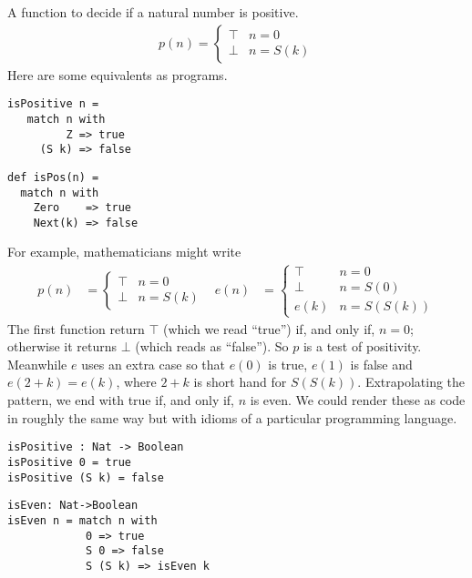 \begin{example}
A function to decide if a natural number is positive.
    \begin{gather*}
        p(n) = \begin{cases}
            \top & n=0\\
            \bot & n=S(k)
        \end{cases}
    \end{gather*}
Here are some equivalents as programs.
\begin{center}
\begin{minipage}{2.5in}
\begin{lstlisting}[language=Hidris]
isPositive n = 
   match n with
         Z => true
     (S k) => false            
\end{lstlisting}
\end{minipage}
\hfill
\begin{minipage}{2in}
\begin{lstlisting}[language=Sava]
def isPos(n) = 
  match n with
    Zero    => true
    Next(k) => false            
\end{lstlisting}
\end{minipage}
\end{center}

                
\end{example}
For example, mathematicians might write
\begin{align*}
    p(n) & = \begin{cases}
        \top & n=0\\
        \bot & n=S(k)
    \end{cases}
    &
    e(n) & = \begin{cases}
        \top & n=0\\
        \bot & n=S(0)\\
        e(k) & n=S(S(k))
    \end{cases}
\end{align*}
The first function return $\top$ (which we read ``true'') if, and only if,
$n=0$; otherwise it returns $\bot$ (which reads as ``false'').  So $p$ is a test
of positivity.  Meanwhile $e$ uses an extra case so that $e(0)$ is true, $e(1)$
is false and $e(2+k)=e(k)$, where $2+k$ is short hand for $S(S(k))$.
Extrapolating the pattern, we end with true if, and only if, $n$ is even.
We could render these as code in roughly the same way but with idioms 
of a particular programming language.
\begin{center}
\begin{minipage}{0.45\textwidth}
\begin{lstlisting}[language=Hidris]
isPositive : Nat -> Boolean
isPositive 0 = true
isPositive (S k) = false
\end{lstlisting}
\end{minipage}
\begin{minipage}{0.45\textwidth}
\begin{lstlisting}[language=Hidris]
isEven: Nat->Boolean 
isEven n = match n with 
            0 => true 
            S 0 => false 
            S (S k) => isEven k
\end{lstlisting}
\end{minipage}
\end{center}
